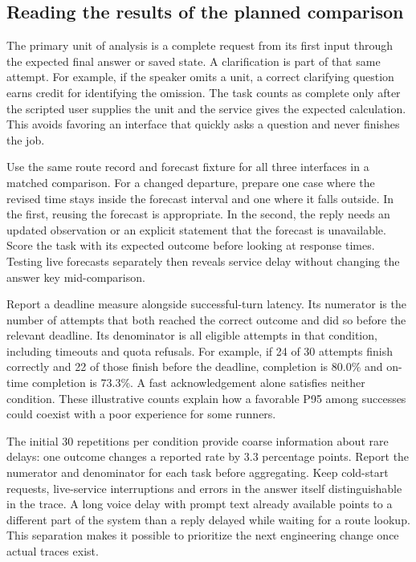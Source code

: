 \documentclass[conference]{IEEEtran}
\begin{document}
\subsection{Reading the results of the planned comparison}
The primary unit of analysis is a complete request from its first input through the expected final answer or saved state. A clarification is part of that same attempt. For example, if the speaker omits a unit, a correct clarifying question earns credit for identifying the omission. The task counts as complete only after the scripted user supplies the unit and the service gives the expected calculation. This avoids favoring an interface that quickly asks a question and never finishes the job.

Use the same route record and forecast fixture for all three interfaces in a matched comparison. For a changed departure, prepare one case where the revised time stays inside the forecast interval and one where it falls outside. In the first, reusing the forecast is appropriate. In the second, the reply needs an updated observation or an explicit statement that the forecast is unavailable. Score the task with its expected outcome before looking at response times. Testing live forecasts separately then reveals service delay without changing the answer key mid-comparison.

Report a deadline measure alongside successful-turn latency. Its numerator is the number of attempts that both reached the correct outcome and did so before the relevant deadline. Its denominator is all eligible attempts in that condition, including timeouts and quota refusals. For example, if 24 of 30 attempts finish correctly and 22 of those finish before the deadline, completion is 80.0\% and on-time completion is 73.3\%. A fast acknowledgement alone satisfies neither condition. These illustrative counts explain how a favorable P95 among successes could coexist with a poor experience for some runners.

The initial 30 repetitions per condition provide coarse information about rare delays: one outcome changes a reported rate by 3.3 percentage points. Report the numerator and denominator for each task before aggregating. Keep cold-start requests, live-service interruptions and errors in the answer itself distinguishable in the trace. A long voice delay with prompt text already available points to a different part of the system than a reply delayed while waiting for a route lookup. This separation makes it possible to prioritize the next engineering change once actual traces exist.
\end{document}
